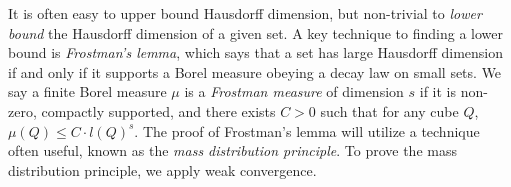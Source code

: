 It is often easy to upper bound Hausdorff dimension, but non-trivial to \emph{lower bound} the Hausdorff dimension of a given set. A key technique to finding a lower bound is \emph{Frostman's lemma}, which says that a set has large Hausdorff dimension if and only if it supports a Borel measure obeying a decay law on small sets. We say a finite Borel measure $\mu$ is a \emph{Frostman measure} of dimension $s$ if it is non-zero, compactly supported, and there exists $C > 0$ such that for any cube $Q$, $\mu(Q) \leq C \cdot l(Q)^s$. The proof of Frostman's lemma will utilize a technique often useful, known as the \emph{mass distribution principle}. To prove the mass distribution principle, we apply weak convergence.

\begin{comment}

\begin{lemma}
	For each $k \geq 0$, let $\mathcal{E}_k$ be a finite collection of non-empty, compact, disjoint subsets of $\RR^d$, such that for each $A \in \mathcal{E}_{k+1}$, there is a unique $A^* \in \mathcal{E}_k$ such that $A \subset A^*$, and for any $A^* \in \mathcal{E}_k$, there is at least one $A \in \mathcal{E}_{k+1}$ with $A \subset A^*$. Let $E_k = \bigcup \mathcal{E}_k$, and let $E_\infty = \bigcap E_k$. Let $\mu: \bigcup_{k \geq 0} \mathcal{E}_k \to [0,\infty)$ be a function such that for any $i$, and for any $A \in \mathcal{E}_i$,
	\begin{equation} \label{equation124069350740597} \mu(A) = \sum \{ \mu(B) : B \in \mathcal{E}_{i+1}, B \subset A \}. \end{equation}
	Then $\mu$ extends to a finite Borel measure on $\RR^d$ supported on $E_\infty$.
\end{lemma}
\begin{proof}
	Let $\mathcal{E} = \bigcup_{k \geq 0} \mathcal{E}_k \cup \mathcal{P}(\RR^d - E_k)$. Then $\mathcal{E}$ is a \emph{semi-ring} of sets:
	\begin{itemize}
		\item \emph{$\mathcal{E}$ is closed under intersections}: Let $A, B \in \mathcal{E}$. Then without loss of generality, swapping $A$ and $B$ if necessary, there exists $i \leq j$ such that $A \in \mathcal{E}_i$ or $A \subset \RR^d - E_i$, and $B \in \mathcal{E}_j$ or $B \subset \RR^d - E_j$.

		If $A \in \mathcal{E}_i$, and $B \in \mathcal{E}_j$, then either $A \cap B = \emptyset$, or $B \subset A$, and $A \cap B = B$. In either case, $A \cap B \in \mathcal{E}$.


\end{comment}
